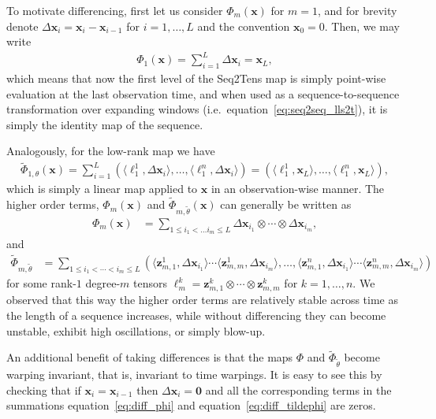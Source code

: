 \documentclass{article} \usepackage{iclr2021_conference,times}
\def\eqref#1{equation~\ref{#1}}
\newcommand{\bx}{\mathbf{x}}
\newcommand{\bz}{\mathbf{z}}
\theoremstyle{plain}
\theoremstyle{definition}
\begin{document}
To motivate differencing, first let us consider $\Phi_m(\bx)$ for $m=1$, and for brevity denote $\Delta \bx_i = \bx_i - \bx_{i-1}$ for $i=1, \dots, L$ and the convention $\bx_0 = 0$. Then, we may write
\begin{align}
    \Phi_1(\bx) = \sum_{i=1}^L \Delta \bx_i = \bx_L,
\end{align}
which means that now the first level of the Seq2Tens map is simply point-wise evaluation at the last observation time, and when used as a sequence-to-sequence transformation over expanding windows (i.e.~\eqref{eq:seq2seq_lls2t}), it is simply the identity map of the sequence.

Analogously, for the low-rank map we have
\begin{align}
    \tilde\Phi_{1,\theta}(\bx) = \sum_{i=1}^L (\langle \ell^1_1, \Delta \bx_i \rangle, \dots, \langle \ell^n_1, \Delta \bx_i \rangle) = (\langle \ell^1_1, \bx_L \rangle, \dots, \langle \ell^n_1, \bx_L \rangle),    
\end{align}
which is simply a linear map applied to $\bx$ in an observation-wise manner. The higher order terms, $\Phi_m(\bx)$ and $\tilde\Phi_{m, \tilde\theta}(\bx)$ can generally be written as
\begin{align} \label{eq:diff_phi}
    \Phi_m(\bx) &= \sum_{1 \leq i_1 < \dots i_m \leq L} \Delta \bx_{i_1} \otimes \cdots \otimes \Delta\bx_{i_m},
\end{align}
and
\begin{align} \label{eq:diff_tildephi}
    \tilde\Phi_{m, \tilde\theta} &= \sum_{1 \leq i_1 < \cdots < i_m \leq L} (\langle \bz^1_{m, 1}, \Delta \bx_{i_1} \rangle \cdots \langle \bz^1_{m, m}, \Delta \bx_{i_m} \rangle, \dots, \langle \bz^n_{m, 1}, \Delta \bx_{i_1} \rangle \cdots \langle \bz^n_{m, m}, \Delta \bx_{i_m} \rangle)
\end{align}
for some rank-$1$ degree-$m$ tensors $\ell^k_m = \bz_{m, 1}^k \otimes \cdots \otimes \bz_{m,m}^k$ for $k=1, \dots, n$. We observed that this way the higher order terms are relatively stable across time as the length of a sequence increases, while without differencing they can become unstable, exhibit high oscillations, or simply blow-up.


An additional benefit of taking differences is that the maps $\Phi$ and $\tilde\Phi_{\tilde\theta}$ become warping invariant, that is, invariant to time warpings. It is easy to see this by checking that if $\bx_i = \bx_{i-1}$ then $\Delta \bx_i = \mathbf{0}$ and all the corresponding terms in the summations \eqref{eq:diff_phi} and \eqref{eq:diff_tildephi} are zeros.
\end{document}
